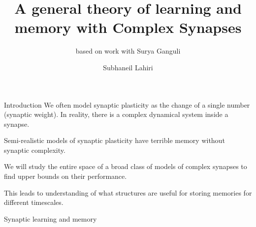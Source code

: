 \documentclass{beamer}%
\title[Complex synapses]{A general theory of learning and memory with Complex Synapses}
\subtitle{\small{based on work with Surya Ganguli}
}
\author{Subhaneil Lahiri%
}
\institute[Stanford]{%
Stanford University, Applied Physics
}
\begin{document}

\begin{frame}
%
 \titlepage
%
\end{frame}


\begin{frame}{Introduction}
%
 We often model synaptic plasticity as the change of a single number (synaptic weight).
 In reality, there is a complex dynamical system inside a synapse.

 \vp Semi-realistic models of synaptic plasticity have terrible memory without synaptic complexity.

 \vp We will study the entire space of a broad class of models of complex synapses to find upper bounds on their performance.
 
 \vp This leads to understanding of what structures are useful for storing memories for different timescales.
%
\end{frame}


\begin{frame}{Synaptic learning and memory}
%
%
%
 \begin{center}
 \end{center}

%
\end{frame}

\end{document}
